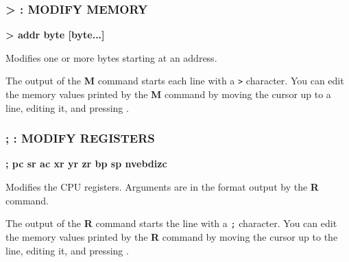 
\subsubsection{> : MODIFY MEMORY}
\begin{description}[leftmargin=2cm,style=nextline]
\item [Format:] {\bf > addr byte [byte...]}
\item [Usage:] Modifies one or more bytes starting at an address.

\item [Remarks:] The output of the {\bf M} command starts each line with a {\tt >} character. You can edit the memory values printed by the {\bf M} command by moving the cursor up to a line, editing it, and pressing .

\end{description}


\subsubsection{; : MODIFY REGISTERS}
\begin{description}[leftmargin=2cm,style=nextline]
\item [Format:] {\bf ; pc sr ac xr yr zr bp sp nvebdizc}
\item [Usage:] Modifies the CPU registers. Arguments are in the format output by the {\bf R} command.

\item [Remarks:] The output of the {\bf R} command starts the line with a {\tt ;} character. You can edit the memory values printed by the {\bf R} command by moving the cursor up to the line, editing it, and pressing .

\end{description}


